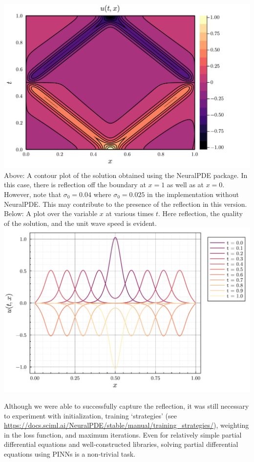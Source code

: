 \documentclass[11pt]{article}
\newcommand{\1}{\mathbf 1}
\begin{document}
\begin{center}
	\includegraphics[width=0.9\linewidth]{fig/nice-wave-NeuralPDE.pdf}
	\\
		Above: A contour plot of the solution obtained using the NeuralPDE package.
		In this case, there is reflection off the boundary at $x = 1$ as well as at $x = 0$.
		However, note that $\sigma_0 = 0.04$ where $\sigma_0 = 0.025$ in the implementation without NeuralPDE.
		This may contribute to the presence of the reflection in this version.
		Below: A plot over the variable $x$ at various times $t$.
		Here reflection, the quality of the solution, and the unit wave speed is evident.
	\\
	\includegraphics[width=0.9\linewidth]{fig/nice-wave-NeuralPDE-per-t.pdf}
\end{center}
Although we were able to successfully capture the reflection, it was still necessary to experiment with initialization, training `strategies' (see \url{https://docs.sciml.ai/NeuralPDE/stable/manual/training_strategies/}), weighting in the loss function, and maximum iterations.
Even for relatively simple partial differential equations and well-constructed libraries, solving partial differential equations using PINNs is a non-trivial task.
\end{document}
